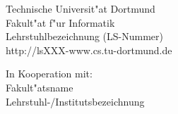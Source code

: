 \begin{titlepage}
\vspace*{2.5cm}
\hspace*{\links}
\begin{minipage}[b]{8cm}
\raggedright
Technische Universit"at Dortmund \\
Fakult"at f"ur Informatik\\
Lehrstuhlbezeichnung (LS-Nummer)\\
http://lsXXX-www.cs.tu-dortmund.de
\end{minipage}
\begin{minipage}[b]{8cm}
\raggedleft
In Kooperation mit:\\
Fakult"atsname\\
Lehrstuhl-/Institutsbezeichnung
\end{minipage}

\end{titlepage}
